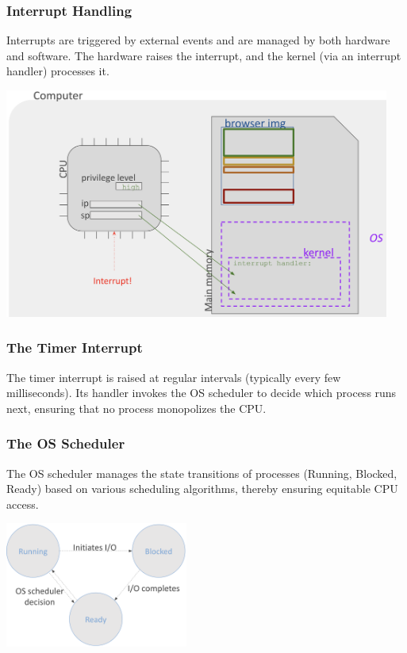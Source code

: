 \documentclass[../../compsys.tex]{subfiles}
\begin{document}
\begin{minipage}[htp]{0.45\textwidth}
\subsubsection*{Interrupt Handling}
Interrupts are triggered by external events and are managed by both hardware and software. The hardware raises the interrupt, and the kernel (via an interrupt handler) processes it.
\vspace{8px}
\begin{center} 
  \includegraphics[width=0.95\textwidth]{chapters/L3/images/interrupt.png}
\end{center}
\end{minipage}

\subsubsection{The Timer Interrupt}
\begin{definition}
The timer interrupt is raised at regular intervals (typically every few milliseconds). Its handler invokes the OS scheduler to decide which process runs next, ensuring that no process monopolizes the CPU.
\end{definition}
\vspace{15px}
\newpage
\subsubsection{The OS Scheduler}
The OS scheduler manages the state transitions of processes (Running, Blocked, Ready) based on various scheduling algorithms, thereby ensuring equitable CPU access.

\begin{center}
  \includegraphics[width=0.45\textwidth]{chapters/L3/images/os-scheduler.png}
\end{center}
\end{document}
